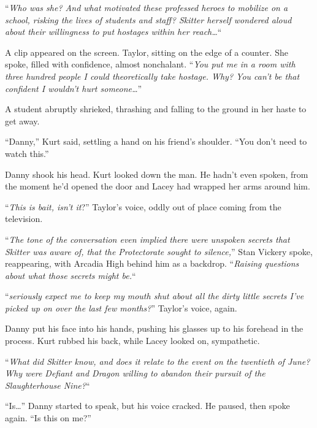 ``\emph{Who was she?  And what motivated these professed heroes to mobilize on a school, risking the lives of students and staff?  Skitter herself wondered aloud about their willingness to put hostages within her reach\ldots}``



A clip appeared on the screen.  Taylor, sitting on the edge of a counter.  She spoke, filled with confidence, almost nonchalant.  ``\emph{You put me in a room with three hundred people I could theoretically take hostage.  Why?  You can't be that confident I wouldn't hurt someone\ldots}''



A student abruptly shrieked, thrashing and falling to the ground in her haste to get away.



``Danny,'' Kurt said, settling a hand on his friend's shoulder.  ``You don't need to watch this.''



Danny shook his head.  Kurt looked down the man.  He hadn't even spoken, from the moment he'd opened the door and Lacey had wrapped her arms around him.



``\emph{This is bait, isn't it}?'' Taylor's voice, oddly out of place coming from the television.



``\emph{The tone of the conversation even implied there were unspoken secrets that Skitter was aware of, that the Protectorate sought to silence,}'' Stan Vickery spoke, reappearing, with Arcadia High behind him as a backdrop.  ``\emph{Raising questions about what those secrets might be.}``



``\emph{\ldotsYou seriously expect me to keep my mouth shut about all the dirty little secrets I've picked up on over the last few months?}''  Taylor's voice, again.



Danny put his face into his hands, pushing his glasses up to his forehead in the process.  Kurt rubbed his back, while Lacey looked on, sympathetic.



``\emph{What did Skitter know, and does it relate to the event  on the twentieth of June?  Why were Defiant and Dragon willing to abandon their pursuit of the Slaughterhouse Nine?}``



``Is\ldots'' Danny started to speak, but his voice cracked.  He paused, then spoke again.  ``Is this on me?''



